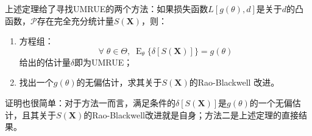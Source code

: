 \begin{note}
	上述定理给了寻找UMRUE的两个方法：如果损失函数$L[g(\theta),d]$是关于$d$的凸函数，$\mathscr{P}$存在完全充分统计量$S(\mathbf{X})$，则：
	\begin{enumerate}
		\item 方程组：
		\begin{equation*}
			\forall\;\theta\in\Theta,\;\operatorname{E}_{\theta}\{\delta[S(\mathbf{X})]\}=g(\theta)
		\end{equation*}
		给出的估计量$\delta$即为UMRUE；
		\item 找出一个$g(\theta)$的无偏估计，求其关于$S(\mathbf{X})$的Rao-Blackwell 改进。
	\end{enumerate}
	证明也很简单：对于方法一而言，满足条件的$\delta[S(\mathbf{X})]$是$g(\theta)$的一个无偏估计，且其关于$S(\mathbf{X})$的Rao-Blackwell改进就是自身；方法二是上述定理的直接结果。
\end{note}
